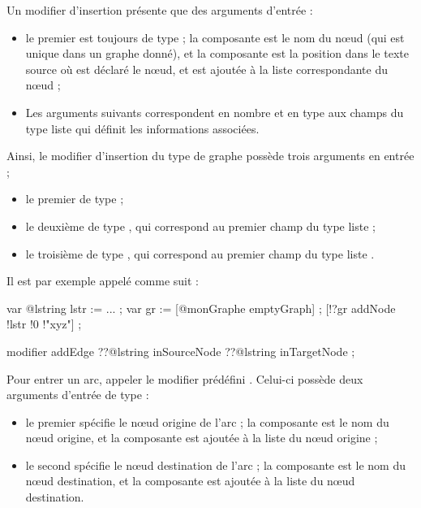 Un modifier d'insertion présente que des arguments d'entrée :
\begin{itemize}
  \item le premier est toujours de type  ; la composante  est le nom du nœud (qui est unique dans un graphe donné), et la composante  est la position dans le texte source où est déclaré le nœud, et est ajoutée à la liste correspondante du nœud ;
  \item Les arguments suivants correspondent en nombre et en type aux champs du type liste qui définit les informations associées.
\end{itemize}

Ainsi, le modifier d'insertion  du type de graphe  possède trois arguments en entrée ;
\begin{itemize}
  \item le premier de type  ;
  \item le deuxième de type , qui correspond au premier champ  du type liste  ;
  \item le troisième de type , qui correspond au premier champ  du type liste .
\end{itemize}

Il est par exemple appelé comme suit :
\begin{galgascode}
var @lstring lstr := ... ;
var gr := [@monGraphe emptyGraph] ;
[!?gr addNode !lstr !0 !"xyz"] ;
\end{galgascode}





\begin{galgascode}
modifier addEdge ??@lstring inSourceNode ??@lstring inTargetNode ;
\end{galgascode}

Pour entrer un arc, appeler le modifier prédéfini . Celui-ci possède deux arguments d'entrée de type  :
\begin{itemize}
  \item le premier spécifie le nœud origine de l'arc ; la composante  est le nom du nœud origine, et la composante  est ajoutée à la liste du nœud origine ;
  \item le second spécifie le nœud destination de l'arc ; la composante  est le nom du nœud destination, et la composante  est ajoutée à la liste du nœud destination.
\end{itemize}








